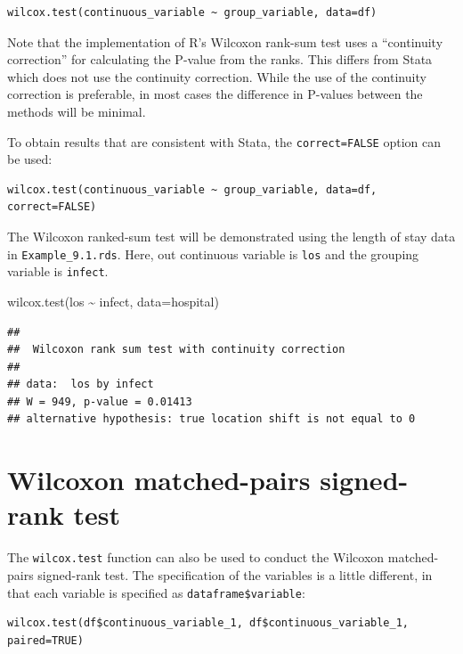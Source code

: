 \documentclass[
]{memoir}
\newenvironment{Shaded}{\begin{snugshade}}{\end{snugshade}}
\newcommand{\AttributeTok}[1]{\textcolor[rgb]{0.77,0.63,0.00}{#1}}
\newcommand{\FunctionTok}[1]{\textcolor[rgb]{0.00,0.00,0.00}{#1}}
\newcommand{\NormalTok}[1]{#1}
\newcommand{\SpecialCharTok}[1]{\textcolor[rgb]{0.00,0.00,0.00}{#1}}
\begin{document}
\begin{verbatim}
wilcox.test(continuous_variable ~ group_variable, data=df)
\end{verbatim}

Note that the implementation of R's Wilcoxon rank-sum test uses a ``continuity correction'' for calculating the P-value from the ranks. This differs from Stata which does not use the continuity correction. While the use of the continuity correction is preferable, in most cases the difference in P-values between the methods will be minimal.

To obtain results that are consistent with Stata, the \texttt{correct=FALSE} option can be used:

\begin{verbatim}
wilcox.test(continuous_variable ~ group_variable, data=df, correct=FALSE)
\end{verbatim}

The Wilcoxon ranked-sum test will be demonstrated using the length of stay data in \texttt{Example\_9.1.rds}. Here, out continuous variable is \texttt{los} and the grouping variable is \texttt{infect}.

\begin{Shaded}
\begin{Highlighting}[]
\FunctionTok{wilcox.test}\NormalTok{(los }\SpecialCharTok{\textasciitilde{}}\NormalTok{ infect, }\AttributeTok{data=}\NormalTok{hospital)}
\end{Highlighting}
\end{Shaded}

\begin{verbatim}
## 
##  Wilcoxon rank sum test with continuity correction
## 
## data:  los by infect
## W = 949, p-value = 0.01413
## alternative hypothesis: true location shift is not equal to 0
\end{verbatim}

\hypertarget{wilcoxon-matched-pairs-signed-rank-test}{%
\section{Wilcoxon matched-pairs signed-rank test}\label{wilcoxon-matched-pairs-signed-rank-test}}

The \texttt{wilcox.test} function can also be used to conduct the Wilcoxon matched-pairs signed-rank test. The specification of the variables is a little different, in that each variable is specified as \texttt{dataframe\$variable}:

\begin{verbatim}
wilcox.test(df$continuous_variable_1, df$continuous_variable_1, paired=TRUE)
\end{verbatim}
\end{document}
